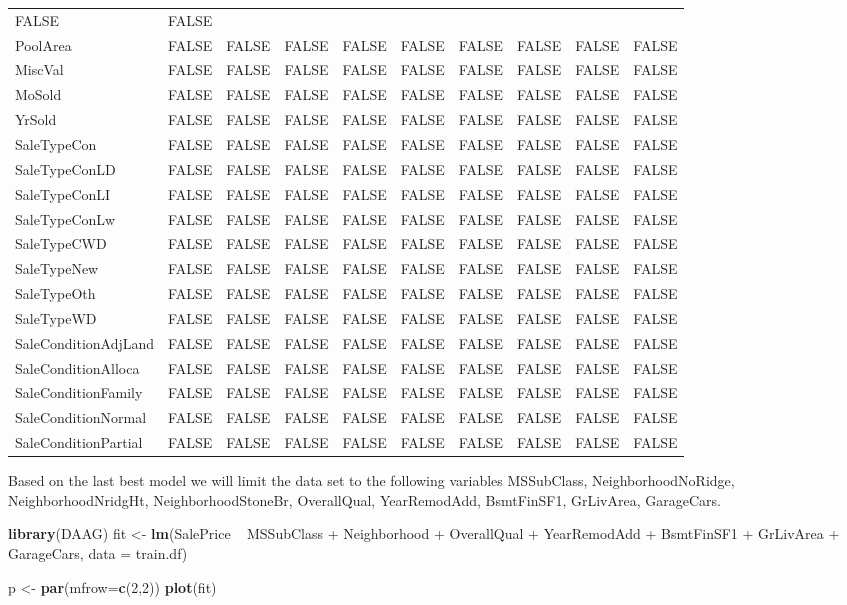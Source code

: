 \documentclass[]{article}
\newenvironment{Shaded}{\begin{snugshade}}{\end{snugshade}}
\newcommand{\KeywordTok}[1]{\textcolor[rgb]{0.13,0.29,0.53}{\textbf{{#1}}}}
\newcommand{\DataTypeTok}[1]{\textcolor[rgb]{0.13,0.29,0.53}{{#1}}}
\newcommand{\DecValTok}[1]{\textcolor[rgb]{0.00,0.00,0.81}{{#1}}}
\newcommand{\StringTok}[1]{\textcolor[rgb]{0.31,0.60,0.02}{{#1}}}
\newcommand{\NormalTok}[1]{{#1}}
\begin{document}
\begin{longtable}[]{@{}llllllllll@{}}
FALSE & FALSE\tabularnewline
PoolArea & FALSE & FALSE & FALSE & FALSE & FALSE & FALSE & FALSE & FALSE
& FALSE\tabularnewline
MiscVal & FALSE & FALSE & FALSE & FALSE & FALSE & FALSE & FALSE & FALSE
& FALSE\tabularnewline
MoSold & FALSE & FALSE & FALSE & FALSE & FALSE & FALSE & FALSE & FALSE &
FALSE\tabularnewline
YrSold & FALSE & FALSE & FALSE & FALSE & FALSE & FALSE & FALSE & FALSE &
FALSE\tabularnewline
SaleTypeCon & FALSE & FALSE & FALSE & FALSE & FALSE & FALSE & FALSE &
FALSE & FALSE\tabularnewline
SaleTypeConLD & FALSE & FALSE & FALSE & FALSE & FALSE & FALSE & FALSE &
FALSE & FALSE\tabularnewline
SaleTypeConLI & FALSE & FALSE & FALSE & FALSE & FALSE & FALSE & FALSE &
FALSE & FALSE\tabularnewline
SaleTypeConLw & FALSE & FALSE & FALSE & FALSE & FALSE & FALSE & FALSE &
FALSE & FALSE\tabularnewline
SaleTypeCWD & FALSE & FALSE & FALSE & FALSE & FALSE & FALSE & FALSE &
FALSE & FALSE\tabularnewline
SaleTypeNew & FALSE & FALSE & FALSE & FALSE & FALSE & FALSE & FALSE &
FALSE & FALSE\tabularnewline
SaleTypeOth & FALSE & FALSE & FALSE & FALSE & FALSE & FALSE & FALSE &
FALSE & FALSE\tabularnewline
SaleTypeWD & FALSE & FALSE & FALSE & FALSE & FALSE & FALSE & FALSE &
FALSE & FALSE\tabularnewline
SaleConditionAdjLand & FALSE & FALSE & FALSE & FALSE & FALSE & FALSE &
FALSE & FALSE & FALSE\tabularnewline
SaleConditionAlloca & FALSE & FALSE & FALSE & FALSE & FALSE & FALSE &
FALSE & FALSE & FALSE\tabularnewline
SaleConditionFamily & FALSE & FALSE & FALSE & FALSE & FALSE & FALSE &
FALSE & FALSE & FALSE\tabularnewline
SaleConditionNormal & FALSE & FALSE & FALSE & FALSE & FALSE & FALSE &
FALSE & FALSE & FALSE\tabularnewline
SaleConditionPartial & FALSE & FALSE & FALSE & FALSE & FALSE & FALSE &
FALSE & FALSE & FALSE\tabularnewline
\bottomrule
\end{longtable}

Based on the last best model we will limit the data set to the following
variables MSSubClass, NeighborhoodNoRidge, NeighborhoodNridgHt,
NeighborhoodStoneBr, OverallQual, YearRemodAdd, BsmtFinSF1, GrLivArea,
GarageCars.

\begin{Shaded}
\begin{Highlighting}[]
\KeywordTok{library}\NormalTok{(DAAG)}
\NormalTok{fit <-}\StringTok{ }\KeywordTok{lm}\NormalTok{(SalePrice ~}\StringTok{ }\NormalTok{MSSubClass +}\StringTok{ }\NormalTok{Neighborhood +}\StringTok{ }
\StringTok{            }\NormalTok{OverallQual +}\StringTok{ }\NormalTok{YearRemodAdd +}\StringTok{ }\NormalTok{BsmtFinSF1 +}\StringTok{ }
\StringTok{            }\NormalTok{GrLivArea +}\StringTok{ }\NormalTok{GarageCars, }\DataTypeTok{data =} \NormalTok{train.df)}

\NormalTok{p <-}\StringTok{ }\KeywordTok{par}\NormalTok{(}\DataTypeTok{mfrow=}\KeywordTok{c}\NormalTok{(}\DecValTok{2}\NormalTok{,}\DecValTok{2}\NormalTok{))}
\KeywordTok{plot}\NormalTok{(fit)}
\end{Highlighting}
\end{Shaded}
\end{document}
